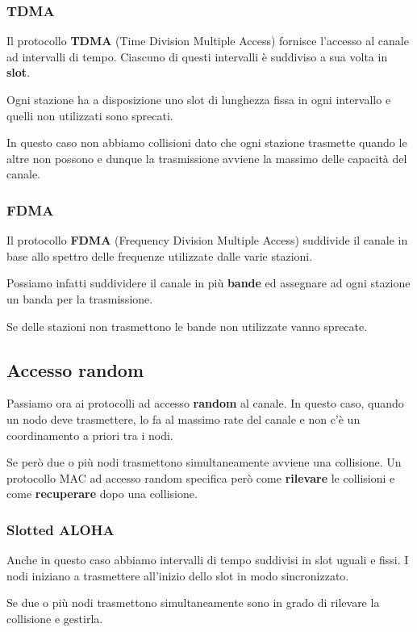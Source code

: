 \subsubsection{TDMA}
Il protocollo \textbf{TDMA} (Time Division Multiple Access) fornisce
l'accesso al canale ad intervalli di tempo. Ciascuno di questi 
intervalli è suddiviso a sua volta in \textbf{slot}.

Ogni stazione ha a disposizione uno slot di lunghezza fissa in ogni
intervallo e quelli non utilizzati sono sprecati.

In questo caso non abbiamo collisioni dato che ogni stazione trasmette
quando le altre non possono e dunque la trasmissione avviene la massimo
delle capacità del canale.

\subsubsection{FDMA}
Il protocollo \textbf{FDMA} (Frequency Division Multiple Access)
suddivide il canale in base allo spettro delle frequenze utilizzate 
dalle varie stazioni.

Possiamo infatti suddividere il canale in più \textbf{bande} ed 
assegnare ad ogni stazione un banda per la trasmissione.

Se delle stazioni non trasmettono le bande non utilizzate vanno 
sprecate.

\subsection{Accesso random}
Passiamo ora ai protocolli ad accesso \textbf{random} al canale. In
questo caso, quando un nodo deve trasmettere, lo fa al massimo rate
del canale e non c'è un coordinamento a priori tra i nodi.

Se però due o più nodi trasmettono simultaneamente avviene una 
collisione. Un protocollo MAC ad accesso random specifica però come
\textbf{rilevare} le collisioni e come \textbf{recuperare} dopo una
collisione.	

\subsubsection{Slotted ALOHA}
Anche in questo caso abbiamo intervalli di tempo suddivisi in slot
uguali e fissi. I nodi iniziano a trasmettere all'inizio dello slot 
in modo sincronizzato.

Se due o più nodi trasmettono simultaneamente sono in grado di 
rilevare la collisione e gestirla.

